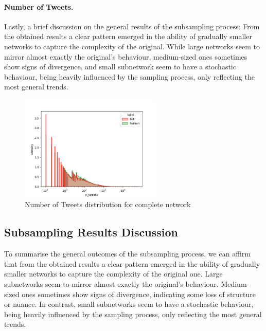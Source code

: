 \documentclass[12pt, a4paper]{article}
\begin{document}
        \paragraph{Number of Tweets.} Lastly, a brief discussion on the general results of the subsampling process: From the obtained results a clear pattern emerged in the ability of gradually smaller networks to capture the complexity of the original. While large networks seem to mirror almost exactly the original's behaviour, medium-sized ones sometimes show signs of divergence, and small subnetwork seem to have a stochastic behaviour, being heavily influenced by the sampling process, only reflecting the most general trends.
        \begin{figure}[H]
        	\centering
        	\includegraphics[width=0.6\textwidth]{results/complete_n_tweets.png}
            \caption{Number of Tweets distribution for complete network}
      	\end{figure}
    \subsection{Subsampling Results Discussion} \label{subsampling_results}
    	To summarise the general outcomes of the subsampling process, we can affirm that from the obtained results a clear pattern emerged in the ability of gradually smaller networks to capture the complexity of the original one. Large subnetworks seem to mirror almost exactly the original's behaviour. Medium-sized ones sometimes show signs of divergence, indicating some loss of structure or nuance. In contrast, small subnetworks seem to have a stochastic behaviour, being heavily influenced by the sampling process, only reflecting the most general trends.
\end{document}
